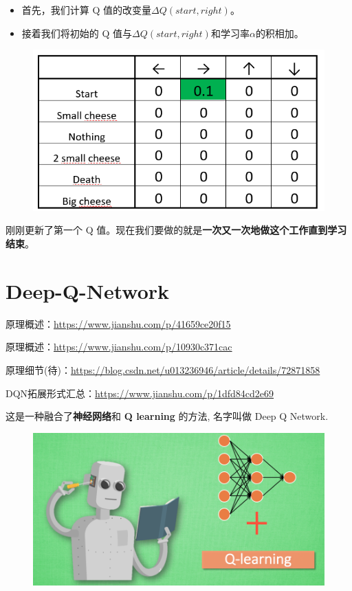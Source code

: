 \documentclass[UTF8,a4paper,12pt]{ctexbook}
\begin{document}
				\begin{itemize}
					\item 首先，我们计算 Q 值的改变量$\Delta Q(start, right)$。
					\item 接着我们将初始的 Q 值与$\Delta Q(start, right)$和学习率$\alpha$的积相加。
				\end{itemize}
				
				\begin{figure}[H]
					\centering
					\includegraphics[width=.7\linewidth]{qExample06}
				\end{figure}
				
				刚刚更新了第一个 Q 值。现在我们要做的就是\textbf{一次又一次地做这个工作直到学习结束}。		
		

	
	\section{Deep-Q-Network}
		原理概述：\url{https://www.jianshu.com/p/41659ce20f15}
		
		原理概述：\url{https://www.jianshu.com/p/10930c371cac} 
		 
		原理细节(待)：\url{https://blog.csdn.net/u013236946/article/details/72871858}
		
		DQN拓展形式汇总：\url{https://www.jianshu.com/p/1dfd84cd2e69}
	
		这是一种融合了\textbf{神经网络}和 \textbf{Q learning} 的方法, 名字叫做 Deep Q Network.
			\begin{figure}[H]
				\centering
				\includegraphics[width=.9\linewidth]{DQN1}
			\end{figure}
			
\end{document}
